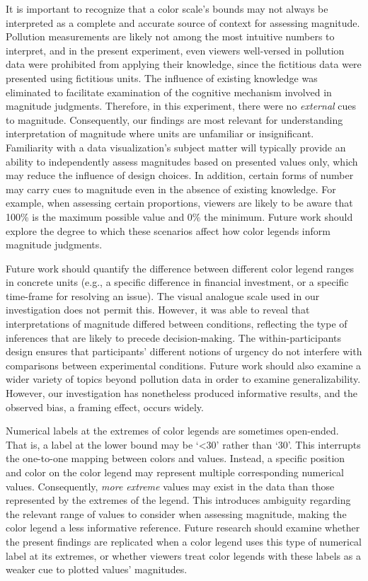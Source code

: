 \documentclass[
]{interact}
\begin{document}
It is important to recognize that a color scale's bounds may not always
be interpreted as a complete and accurate source of context for
assessing magnitude. Pollution measurements are likely not among the
most intuitive numbers to interpret, and in the present experiment, even
viewers well-versed in pollution data were prohibited from applying
their knowledge, since the fictitious data were presented using
fictitious units. The influence of existing knowledge was eliminated to
facilitate examination of the cognitive mechanism involved in magnitude
judgments. Therefore, in this experiment, there were no \emph{external}
cues to magnitude. Consequently, our findings are most relevant for
understanding interpretation of magnitude where units are unfamiliar or
insignificant. Familiarity with a data visualization's subject matter
will typically provide an ability to independently assess magnitudes
based on presented values only, which may reduce the influence of design
choices. In addition, certain forms of number may carry cues to
magnitude even in the absence of existing knowledge. For example, when
assessing certain proportions, viewers are likely to be aware that 100\%
is the maximum possible value and 0\% the minimum. Future work should
explore the degree to which these scenarios affect how color legends
inform magnitude judgments.

Future work should quantify the difference between different color
legend ranges in concrete units (e.g., a specific difference in
financial investment, or a specific time-frame for resolving an issue).
The visual analogue scale used in our investigation does not permit
this. However, it was able to reveal that interpretations of magnitude
differed between conditions, reflecting the type of inferences that are
likely to precede decision-making. The within-participants design
ensures that participants' different notions of urgency do not interfere
with comparisons between experimental conditions. Future work should
also examine a wider variety of topics beyond pollution data in order to
examine generalizability. However, our investigation has nonetheless
produced informative results, and the observed bias, a framing effect,
occurs widely.

Numerical labels at the extremes of color legends are sometimes
open-ended. That is, a label at the lower bound may be `\textless30'
rather than `30'. This interrupts the one-to-one mapping between colors
and values. Instead, a specific position and color on the color legend
may represent multiple corresponding numerical values. Consequently,
\emph{more extreme} values may exist in the data than those represented
by the extremes of the legend. This introduces ambiguity regarding the
relevant range of values to consider when assessing magnitude, making
the color legend a less informative reference. Future research should
examine whether the present findings are replicated when a color legend
uses this type of numerical label at its extremes, or whether viewers
treat color legends with these labels as a weaker cue to plotted values'
magnitudes.
\end{document}
